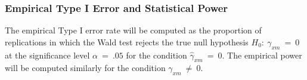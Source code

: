 \documentclass[
  man]{apa7}
\begin{document}
\hypertarget{empirical-type-i-error-and-statistical-power}{%
\subsubsection{Empirical Type I Error and Statistical Power}\label{empirical-type-i-error-and-statistical-power}}

The empirical Type I error rate will be computed as the proportion of replications in which the Wald test rejects the true null hypothesis \(H_{0}: \ \gamma_{xm} \ = \ 0\) at the significance level \(\alpha \ = \ .05\) for the condition \(\hat{\gamma}_{xm} \ = \ 0\). The empirical power will be computed similarly for the condition \(\gamma_{xm} \ \neq \ 0\).
\end{document}

